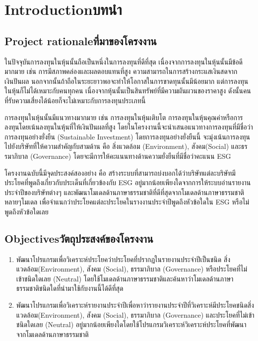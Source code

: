 \chapter{\ifenglish Introduction\else บทนำ\fi}

\section{\ifenglish Project rationale\else ที่มาของโครงงาน\fi}

    \enskip \enskip \enskip ในปัจจุบันการลงทุนในหุ้นนั้นถือเป็นหนึ่งในการลงทุนที่ดีที่สุด เนื่องจากการลงทุนในหุ้นนั้นมีข้อดีมากมาย
    เช่น การมีสภาพคล่องและผลตอบแทนที่สูง ความสามารถในการสร้างกระแสเงินสดจากเงินปันผล
    นอกจากนั้นถ้าถือในระยะยาวพอจะทำให้โอกาสในการขาดทุนนั้นมีน้อยมาก
    แต่การลงทุนในหุ้นก็ไม่ได้เหมาะกับคนทุกคน
    เนื่องจากหุ้นนั้นเป็นสินทรัพย์ที่มีความผันผวนของราคาสูง
    ดังนั้นคนที่รับความเสี่ยงได้น้อยก็จะไม่เหมาะกับการลงทุนประเภทนี้


    การลงทุนในหุ้นนั้นมีแนวทางมากมาย เช่น การลงทุนในหุ้นเติบโต 
    การลงทุนในหุ้นคุณค่าหรือการลงทุนโดยเน้นลงทุนในหุ้นที่ให้เงินปันผลที่สูง 
    โดยในโครงงานนี้จะนำเสนอแนวทางการลงทุนที่มีชื่อว่า 
    การลงทุนอย่างยั่งยืน (Sustainable Investment) โดยการลงทุนอย่างยั่งยืนนี้
    จะมุ่งเน้นการลงทุนไปยังบริษัทที่ให้ความสำคัญกับสามด้าน คือ สิ่งแวดล้อม (Environment), สังคม(Social)
    และธรรมาภิบาล (Governance) โดยจะมีการให้คะแนนทางด้านความยั่งยืนที่มีชื่อว่าคะแนน ESG

    โครงงานฉบับนี้มีจุดประสงค์สองอย่าง คือ สร้างระบบที่สามารถบ่งบอกได้ว่าบริษัทแต่ละบริษัทมีประโยคที่พูดถึงเกี่ยวกับประเด็นที่เกี่ยวข้องกับ ESG
    อยู่มากน้อยเพียงใดจากการให้ระบบอ่านรายงานประจำปีของบริษัทต่างๆ และพัฒนาโมเดลด้านภาษาธรรมชาติที่ดีที่สุดจากโมเดลด้านภาษาธรรมชาติหลายๆโมเดล
    เพื่อจำแนกว่าประโยคแต่ละประโยคในรางงานประจำปีพูดถึงหัวข้อใดใน ESG หรือไม่พูดถึงหัวข้อใดเลย
\section{\ifenglish Objectives\else วัตถุประสงค์ของโครงงาน\fi}
\begin{enumerate} 
    \item
    พัฒนาโปรแกรมเพื่อวิเคราะห์ประโยคว่าประโยคที่ปรากฏในรายงานประจำปีเป็นชนิด
    สิ่งแวดล้อม(Environment), สังคม (Social), ธรรมาภิบาล (Governance) 
    หรือประโยคที่ไม่เข้าชนิดใดเลย (Neutral) 
    โดยใช้โมเดลด้านภาษาธรรมชาติและค้นหาว่าโมเดลด้านภาษาธรรมชาติชนิดใดที่นำมาใช้กับงานนี้ได้ดีที่สุด
    \item
    พัฒนาโปรแกรมเพื่อวิเคราะห์รายงานประจำปีเพื่อหาว่ารายงานประจำปีที่วิเคราะห์มีประโยคชนิดสิ่งแวดล้อม(Environment),
    สังคม (Social), ธรรมาภิบาล (Governance) 
    และประโยคที่ไม่เข้าชนิดใดเลย (Neutral) อยู่มากน้อยเพียงใดโดยใช้โปรแกรมวิเคราะห์วิเคราะห์ประโยคที่พัฒนาจากโมเดลด้านภาษาธรรมชาติ
\end{enumerate}

